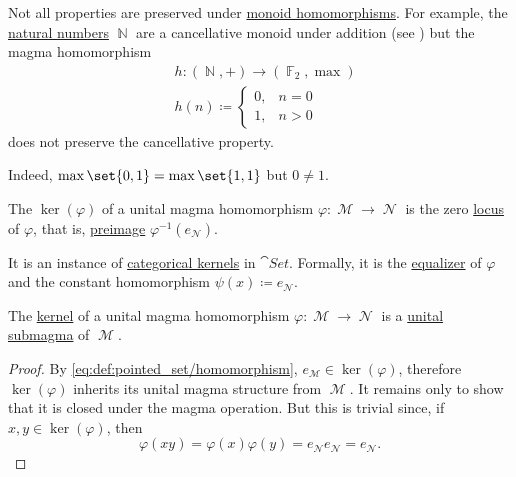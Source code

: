 \begin{example}\label{ex:monoid_cancellation_not_preserved_by_homomorphism}
  Not all properties are preserved under \hyperref[def:unital_magma/homomorphism]{monoid homomorphisms}. For example, the \hyperref[def:natural_numbers]{natural numbers} \( \BbbN \) are a cancellative monoid under addition (see ) but the magma homomorphism
  \begin{equation*}
    \begin{aligned}
      &h: (\BbbN, +) \to (\hyperref[thm:galois_field_existence]{\BbbF_2}, \max) \\
      &h(n) \coloneqq \begin{cases}
        0, &n = 0 \\
        1, &n > 0
      \end{cases}
    \end{aligned}
  \end{equation*}
  does not preserve the cancellative property.

  Indeed, \( \max\set{ 0, 1} = \max\set{ 1, 1 } \) but \( 0 \neq 1 \).
\end{example}

\begin{definition}\label{def:unital_magma_kernel}
  The  \( \ker(\varphi) \) of a unital magma homomorphism \( \varphi: \mscrM \to \mscrN \) is the zero \hyperref[def:zero_locus]{locus} of \( \varphi \), that is, \hyperref[def:function/preimage]{preimage} \( \varphi^{-1}(e_{\mscrN}) \).

  It is an instance of \hyperref[def:categorical_kernel]{categorical kernels} in \hyperref[def:category_of_sets]{\( \cat{Set} \)}. Formally, it is the \hyperref[thm:set_categorical_limits/equalizer]{equalizer} of \( \varphi \) and the constant homomorphism \( \psi(x) \coloneqq e_{\mscrN} \).
\end{definition}

\begin{proposition}\label{thm:unital_magma_kernel_is_submagma}
  The \hyperref[def:unital_magma_kernel]{kernel} of a unital magma homomorphism \( \varphi: \mscrM \to \mscrN \) is a \hyperref[def:first_order_substructure]{unital submagma} of \( \mscrM \).
\end{proposition}
\begin{proof}
  By \eqref{eq:def:pointed_set/homomorphism}, \( e_{\mscrM} \in \ker(\varphi) \), therefore \( \ker(\varphi) \) inherits its unital magma structure from \( \mscrM \). It remains only to show that it is closed under the magma operation. But this is trivial since, if \( x, y \in \ker(\varphi) \), then
  \begin{equation*}
    \varphi(xy) = \varphi(x) \varphi(y) = e_{\mscrN} e_{\mscrN} = e_{\mscrN}.
  \end{equation*}
\end{proof}
